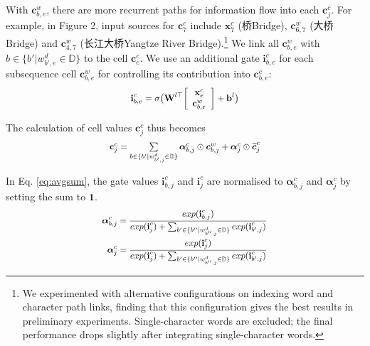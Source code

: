 \documentclass[11pt,a4paper]{article}
\newcommand*{\Scale}[2][4]{\scalebox{#1}{$#2$}}
\begin{document}
\begin{CJK*}{UTF8}{gbsn}
With $\textbf{c}^w_{b,e}$, there are more recurrent paths for information flow into each $\textbf{c}^c_j$. For example, in Figure 2, input sources for $\textbf{c}^c_7$ include $\textbf{x}^c_7$ (桥\;Bridge), $\textbf{c}^w_{6,7}$ (大桥\;Bridge) and $\textbf{c}^w_{4,7}$ (长江大桥\;Yangtze River Bridge).\footnote{We experimented with alternative configurations on indexing word and character path links, finding that this configuration gives the best results in preliminary experiments. Single-character words are excluded; the final performance drops slightly after integrating single-character words.} We link all $\textbf{c}_{b,e}^w$ with $b\in \{b'|w^d_{b',e}\in \mathbb{D}\}$ to the cell $\textbf{c}_e^c$.
We use an additional gate $\textbf{i}^c_{b,e}$ for each subsequence cell $\textbf{c}^w_{b,e}$ for controlling its contribution into $\textbf{c}^c_{b,e}$:
\begin{equation}
\Scale[0.9]{
 \label{eq:gw}\\
\textbf{i}_{b,e}^c = \sigma
\big(
\textbf{W}^{l\top}{\left[ \begin{array}{c}
\textbf{x}_{e}^c\\
\textbf{c}_{b,e}^w\\ 
\end{array} 
\right ]} 
+\textbf{b}^l
\big) \\
}
\end{equation}


The calculation of cell values $\textbf{c}^c_j$ thus becomes
\begin{equation}\label{eq:avgsum}
\Scale[0.9]{
\textbf{c}_j^c =  \sum\limits_{b\in \{b'|w^d_{b',j} \in \mathbb{D}\}} \boldsymbol\alpha_{b,j}^{c}\odot \boldsymbol{c}_{b,j}^{w} + \boldsymbol\alpha^c_j\odot \boldsymbol{\widetilde{c}}_j^c 
}
\end{equation}

In Eq. \ref{eq:avgsum}, the gate values $\textbf{i}_{b,j}^c$ and $\textbf{i}^c_j$ are normalised to $\boldsymbol\alpha_{b,j}^{c}$ and $\boldsymbol\alpha^{c}_j$ by setting the sum to $\textbf{1}$.
\begin{equation} \label{eq:norm}
\Scale[0.88]{
\begin{aligned}
\boldsymbol\alpha_{b,j}^{c} &= \dfrac{exp(\textbf{i}_{b,j}^c)}{exp(\textbf{i}^c_j)+\sum_{b'\in \{b''|w^d_{b'',j} \in \mathbb{D}\}}exp(\textbf{i}_{b',j}^c)} \\
\boldsymbol\alpha^{c}_j &= \dfrac{exp(\textbf{i}^c_j)}{exp(\textbf{i}^c_j)+\sum_{b'\in \{b''|w^d_{b'',j} \in \mathbb{D}\}}exp(\textbf{i}_{b',j}^c)} \\
\end{aligned}
}
\end{equation}


\end{CJK*}
\end{document}
